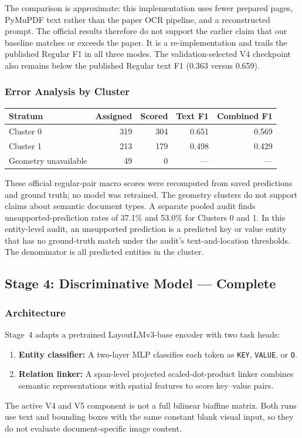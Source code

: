 \documentclass[11pt,a4paper]{article}
\begin{document}
The comparison is approximate: this implementation uses fewer prepared pages,
PyMuPDF text rather than the paper OCR pipeline, and a reconstructed prompt.
The official results therefore do not support the earlier claim that our
baseline matches or exceeds the paper. It is a re-implementation and trails the
published Regular F1 in all three modes. The validation-selected V4 checkpoint
also remains below the published Regular text F1 (0.363 versus 0.659).

\subsubsection*{Error Analysis by Cluster}

\begin{center}
\begin{tabular}{lrrrr}
\toprule
\textbf{Stratum} & \textbf{Assigned} & \textbf{Scored} & \textbf{Text F1} & \textbf{Combined F1} \\
\midrule
Cluster 0 & 319 & 304 & 0.651 & 0.569 \\
Cluster 1 & 213 & 179 & 0.498 & 0.429 \\
Geometry unavailable & 49 & 0 & --- & --- \\
\bottomrule
\end{tabular}
\end{center}

These official regular-pair macro scores were recomputed from saved predictions
and ground truth; no model was retrained. The geometry clusters do not support
claims about semantic document types. A separate pooled audit finds
unsupported-prediction rates of 37.1\% and 53.0\% for Clusters 0 and 1. In
this entity-level audit, an unsupported prediction is a predicted key or value
entity that has no ground-truth match under the audit's text-and-location
thresholds. The denominator is all predicted entities in the cluster.

\subsection{Stage 4: Discriminative Model --- Complete}

\subsubsection*{Architecture}

Stage~4 adapts a pretrained LayoutLMv3-base encoder with two task heads:
\begin{enumerate}[nosep]
  \item \textbf{Entity classifier:} A two-layer MLP classifies each token as
  \texttt{KEY}, \texttt{VALUE}, or \texttt{O}.
  \item \textbf{Relation linker:} A span-level projected scaled-dot-product
  linker combines semantic representations with spatial features to score
  key--value pairs.
\end{enumerate}
The active V4 and V5 component is not a full bilinear biaffine matrix. Both runs
use text and bounding boxes with the same constant blank visual input, so they
do not evaluate document-specific image content.
\end{document}
